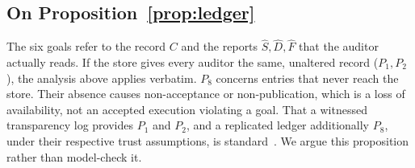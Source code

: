 \subsection*{On Proposition~\ref{prop:ledger}}

The six goals refer to the record $C$ and the reports $\hat S,\hat D,\hat F$ that the
auditor actually reads. If the store gives every auditor the same, unaltered record
($P_1,P_2$), the analysis above applies verbatim. $P_8$ concerns entries that never reach
the store. Their absence causes non-acceptance or non-publication, which is a loss of
availability, not an accepted execution violating a goal. That a witnessed transparency
log provides $P_1$ and $P_2$, and a replicated ledger additionally $P_8$, under their
respective trust assumptions, is standard~\cite{rfc6962}. We argue this proposition rather
than model-check it.

